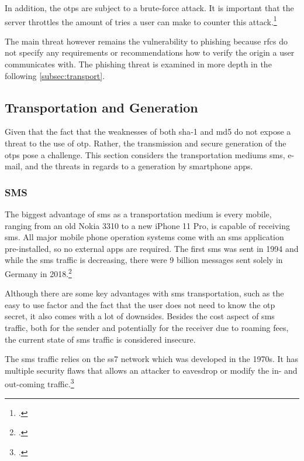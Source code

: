 In addition, the \glspl{otp} are subject to a brute-force attack. It is important that the server throttles the amount of tries a user can make to counter this attack.\footcites[See][6]{m2011rfc}[See][21-22]{m2005rfc}[See][240]{Schwartz2018}

The main threat however remains the vulnerability to phishing because \glspl{rfc} do not specify any requirements or recommendations how to verify the origin a user communicates with. The phishing threat is examined in more depth in the following \autoref{subsec:transport}.

\subsection{Transportation and Generation}
\label{subsec:transport}

Given that the fact that the weaknesses of both \gls{sha}-1 and \gls{md}5 do not expose a threat to the use of \gls{otp}. Rather, the transmission and secure generation of the \glspl{otp} pose a challenge. This section considers the transportation mediums \gls{sms}, e-mail, and the threats in regards to a generation by smartphone apps.

\subsubsection{SMS}

The biggest advantage of \gls{sms} as a transportation medium is every mobile, ranging from an old Nokia 3310 to a new iPhone 11 Pro, is capable of receiving \gls{sms}. All major mobile phone operation systems come with an \gls{sms} application pre-installed, so no external apps are required. The first \gls{sms} was sent in 1994 and while the \gls{sms} traffic is decreasing, there were 9 billion messages sent solely in Germany in 2018.\footcites[See][2--3]{alpert2012mobile}[See][57]{bundesnetzagentur}

Although there are some key advantages with \gls{sms} transportation, such as the easy to use factor and the fact that the user does not need to know the \gls{otp} secret, it also comes with a lot of downsides. Besides the cost aspect of \gls{sms} traffic, both for the sender and potentially for the receiver due to roaming fees, the current state of \gls{sms} traffic is considered insecure.

The \gls{sms} traffic relies on the \gls{ss7} network which was developed in the 1970s. It has multiple security flaws that allows an attacker to eavesdrop or modify the in- and out-coming traffic.\footcites[See][17--18]{WELCH201717}[See][3--4]{7997246}[See][40, 46]{puzankov2017stealthy}

